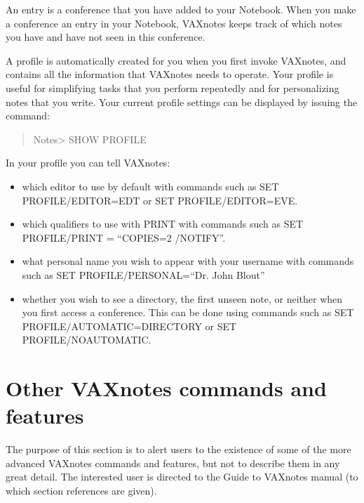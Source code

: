 An entry is a conference that you have added to your Notebook. When you
make a conference an entry in your Notebook, VAXnotes keeps track 
of which notes you have and have not seen in this conference.

A profile is automatically created for you when you first invoke VAXnotes,
and contains all the information that VAXnotes needs to operate. Your profile
is useful for simplifying tasks that you perform repeatedly and for 
personalizing notes that you write. Your current profile settings
can be displayed by issuing the command:

\begin{quote}\tt

Notes> SHOW PROFILE

\end{quote}

In your profile you can tell VAXnotes:

\begin{itemize}

\item which editor to use by default with commands such as
SET PROFILE/EDITOR=EDT or SET PROFILE/EDITOR=EVE.

\item which qualifiers to use with PRINT with commands such as
SET PROFILE/PRINT = ``COPIES=2 /NOTIFY''. 

\item what personal name you wish to appear with your username
with commands such as SET PROFILE/PERSONAL=``Dr. John Blout''

\item whether you wish to see a directory, the first unseen note,
or neither when you first access a conference. This can be done 
using commands such as SET PROFILE/AUTOMATIC=DIRECTORY or 
SET PROFILE/NOAUTOMATIC.

\end{itemize}

\section {Other VAXnotes commands and features}

The purpose of this section is to alert users to the existence
of some of the more advanced
VAXnotes commands and features, but not to describe them in any great
detail. The interested user is directed to the Guide to VAXnotes manual (to
which section references are given). 

